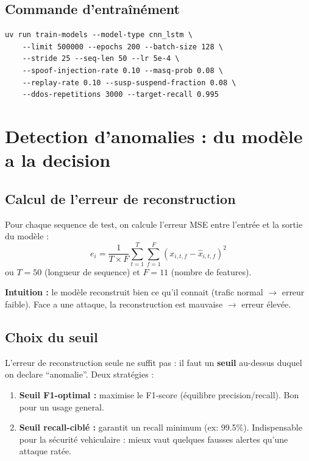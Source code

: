 \documentclass[12pt,a4paper]{article}
\begin{document}
\subsection{Commande d'entraînément}

\begin{lstlisting}[basicstyle=\ttfamily\small, breaklines=true]
uv run train-models --model-type cnn_lstm \
    --limit 500000 --epochs 200 --batch-size 128 \
    --stride 25 --seq-len 50 --lr 5e-4 \
    --spoof-injection-rate 0.10 --masq-prob 0.08 \
    --replay-rate 0.10 --susp-suspend-fraction 0.08 \
    --ddos-repetitions 3000 --target-recall 0.995
\end{lstlisting}

\section{Detection d'anomalies : du modèle a la decision}

\subsection{Calcul de l'erreur de reconstruction}

Pour chaque sequence de test, on calcule l'erreur MSE entre l'entrée et la sortie du modèle :
\begin{equation}
    e_i = \frac{1}{T \times F} \sum_{t=1}^{T} \sum_{f=1}^{F} (x_{i,t,f} - \hat{x}_{i,t,f})^2
\end{equation}
ou $T=50$ (longueur de sequence) et $F=11$ (nombre de features).

\textbf{Intuition :} le modèle reconstruit bien ce qu'il connait (trafic normal $\to$ erreur faible). Face a une attaque, la reconstruction est mauvaise $\to$ erreur élevée.

\subsection{Choix du seuil}

L'erreur de reconstruction seule ne suffit pas : il faut un \textbf{seuil} au-dessus duquel on declare ``anomalie''. Deux stratégies :

\begin{enumerate}
    \item \textbf{Seuil F1-optimal :} maximise le F1-score (équilibre precision/recall). Bon pour un usage general.
    \item \textbf{Seuil recall-ciblé :} garantit un recall minimum (ex: 99.5\%). Indispensable pour la sécurité vehiculaire : mieux vaut quelques fausses alertes qu'une attaque ratée.
\end{enumerate}
\end{document}
